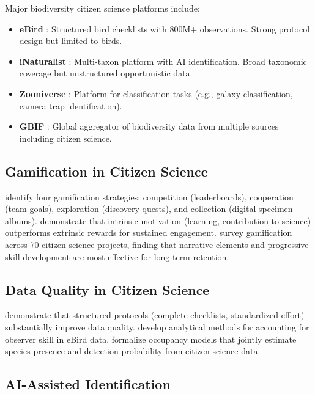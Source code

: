 \documentclass[11pt,a4paper]{article}
\begin{document}
Major biodiversity citizen science platforms include:
\begin{itemize}
  \item \textbf{eBird} \citep{sullivan2014ebird}: Structured bird
    checklists with 800M+ observations. Strong protocol design but
    limited to birds.
  \item \textbf{iNaturalist} \citep{inaturalist2024}: Multi-taxon
    platform with AI identification. Broad taxonomic coverage but
    unstructured opportunistic data.
  \item \textbf{Zooniverse} \citep{simpson2014zooniverse}: Platform
    for classification tasks (e.g., galaxy classification, camera
    trap identification).
  \item \textbf{GBIF} \citep{gbif2024}: Global aggregator of
    biodiversity data from multiple sources including citizen science.
\end{itemize}

\subsection{Gamification in Citizen Science}

\citet{bowser2013gamifying} identify four gamification strategies:
competition (leaderboards), cooperation (team goals), exploration
(discovery quests), and collection (digital specimen albums).
\citet{eveleigh2014designing} demonstrate that intrinsic motivation
(learning, contribution to science) outperforms extrinsic rewards for
sustained engagement. \citet{preece2019citizen} survey
gamification across 70 citizen science projects, finding that narrative
elements and progressive skill development are most effective for
long-term retention.

\subsection{Data Quality in Citizen Science}

\citet{kelling2015can} demonstrate that structured protocols (complete
checklists, standardized effort) substantially improve data quality.
\citet{johnston2020analytical} develop analytical methods for
accounting for observer skill in eBird data. \citet{isaac2014statistics}
formalize occupancy models that jointly estimate species presence
and detection probability from citizen science data.

\subsection{AI-Assisted Identification}
\end{document}
